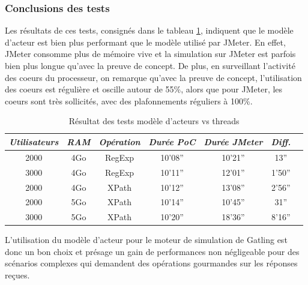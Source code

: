 \subsubsection{Conclusions des tests}
Les résultats de ces tests, consignés dans le tableau \ref{result_tests}, indiquent que le modèle d'acteur est bien plus performant que le modèle utilisé par JMeter. En effet, JMeter consomme plus de mémoire vive et la simulation sur JMeter est parfois bien plus longue qu'avec la preuve de concept. De plus, en surveillant l'activité des coeurs du processeur, on remarque qu'avec la preuve de concept, l'utilisation des coeurs est régulière et oscille autour de 55\%, alors que pour JMeter, les coeurs sont très sollicités, avec des plafonnements réguliers à 100\%.
\begin{center}
\begin{table}[h]
\begin{tabular}{c c c c c c l}
\em{Utilisateurs} & \em{RAM} & \em{Opération} & \em{Durée PoC} & \em{Durée JMeter} & \em{Diff.}\\ \hline
2000 & 4Go & RegExp & 10'08'' & 10'21'' & 13''\\
3000 & 4Go & RegExp & 10'11'' & 12'01'' & 1'50''\\
2000 & 4Go & XPath & 10'12'' & 13'08'' & 2'56''\\
2000 & 5Go & XPath & 10'14'' & 10'45'' & 31''\\
3000 & 5Go & XPath & 10'20'' & 18'36'' & 8'16''\\
\end{tabular}
\caption{Résultat des tests modèle d'acteurs vs threads}
\label{result_tests}
\end{table}
\end{center}
L'utilisation du modèle d'acteur pour le moteur de simulation de Gatling est donc un bon choix et présage un gain de performances non négligeable pour des scénarios complexes qui demandent des opérations gourmandes sur les réponses reçues.

